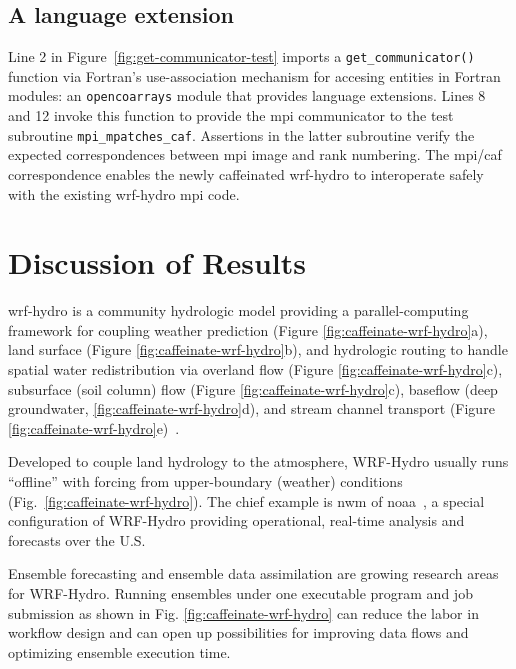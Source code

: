 \subsection{A language extension}
Line 2 in Figure~\ref{fig:get-communicator-test} imports a \texttt{get\_communicator()} function via Fortran's
use-association mechanism for accesing entities in Fortran modules: an \texttt{opencoarrays} module that
provides language extensions.  Lines 8 and 12 invoke this function
to provide the \gls{mpi} communicator to the test subroutine \texttt{mpi\_mpatches\_caf}.  Assertions in the
latter subroutine verify the expected correspondences between \gls{mpi} image and rank numbering.
The \gls{mpi}/\gls{caf} correspondence enables the newly caffeinated \gls{wrf-hydro}
to interoperate safely with the existing \gls{wrf-hydro} \gls{mpi} code.

\section{Discussion of Results}\label{sec:discussion}
\gls{wrf-hydro} is a community hydrologic model providing a parallel-computing
framework for coupling weather prediction (Figure \ref{fig:caffeinate-wrf-hydro}a), land surface
(Figure \ref{fig:caffeinate-wrf-hydro}b), and hydrologic routing to handle spatial water redistribution
via overland flow (Figure \ref{fig:caffeinate-wrf-hydro}c), subsurface (soil column) flow (Figure \ref{fig:caffeinate-wrf-hydro}c),
baseflow (deep groundwater, \ref{fig:caffeinate-wrf-hydro}d), and stream channel transport
(Figure \ref{fig:caffeinate-wrf-hydro}e)~\cite{gochisEtal2014}.

Developed to couple land hydrology to the atmosphere,
WRF-Hydro usually runs ``offline'' with
forcing from upper-boundary (weather) conditions (Fig.~\ref{fig:caffeinate-wrf-hydro}).
The chief example is \gls{nwm} of \gls{noaa}~\cite{noaa2016}, a  special
configuration of WRF-Hydro providing operational, real-time analysis and forecasts
over the U.S.

Ensemble forecasting and ensemble data assimilation are
growing research areas for WRF-Hydro. Running ensembles under one
executable program and job submission as shown in
Fig. \ref{fig:caffeinate-wrf-hydro} can reduce the
labor in workflow design and can open up
possibilities for improving data flows and optimizing ensemble
execution time.

